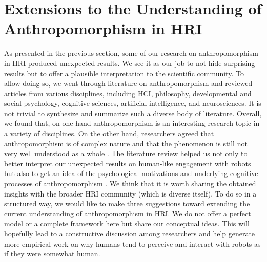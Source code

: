 \documentclass{frontiersSCNS} %
\begin{document}
%

%
%
%
%
%
%


\section{Extensions to the Understanding of Anthropomorphism in HRI}
\label{sec:our-ideas}

As presented in the previous section, some of our research on anthropomorphism in HRI produced unexpected results. We see it as our job to not hide surprising results but to offer a plausible interpretation to the scientific community.
To allow doing so, we went through literature on anthropomorphism and reviewed articles from various disciplines, including HCI, philosophy, developmental and social psychology, cognitive sciences, artificial intelligence, and neurosciences.
It is not trivial to synthesize and summarize such a diverse body of literature. Overall, we found that, on one hand anthropomorphism is an interesting research topic in a variety of disciplines. On the other hand, researchers agreed that anthropomorphism is of complex nature and that the phenomenon is still not very well understood as a whole \citep{duffy_anthropomorphism_2003,epley_seeing_2007}.
The literature review helped us not only to better interpret our unexpected results on human-like engagement with robots but also to get an idea of the psychological motivations and underlying cognitive processes of anthropomorphism \citep{epley_seeing_2007}. We think that it is worth sharing the obtained insights with the broader HRI community (which is diverse itself).
To do so in a structured way, we would like to make three suggestions toward extending the current understanding of anthropomorphism in HRI. We do not offer a perfect model or a complete framework here but share our conceptual ideas. This will hopefully lead to a constructive discussion among researchers and help generate more empirical work on why humans tend to perceive and interact with robots as if they were somewhat human. 

%
%
%
%
%
%
\end{document}

